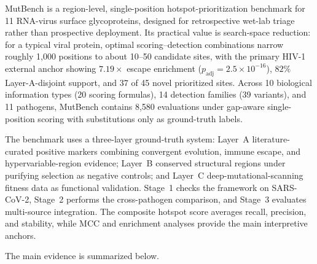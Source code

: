 MutBench is a region-level, single-position hotspot-prioritization benchmark for 11 RNA-virus surface glycoproteins, designed for retrospective wet-lab triage rather than prospective deployment. Its practical value is search-space reduction: for a typical viral protein, optimal scoring--detection combinations narrow roughly 1{,}000 positions to about 10--50 candidate sites, with the primary HIV-1 external anchor showing $7.19\times$ escape enrichment ($p_{\text{adj}} = 2.5 \times 10^{-16}$), $82\%$ Layer-A-disjoint support, and 37 of 45 novel prioritized sites. Across 10 biological information types (20 scoring formulas), 14 detection families (39 variants), and 11 pathogens, MutBench contains 8{,}580 evaluations under gap-aware single-position scoring with substitutions only as ground-truth labels.

The benchmark uses a three-layer ground-truth system: Layer~A literature-curated positive markers combining convergent evolution, immune escape, and hypervariable-region evidence; Layer~B conserved structural regions under purifying selection as negative controls; and Layer~C deep-mutational-scanning fitness data as functional validation. Stage~1 checks the framework on SARS-CoV-2, Stage~2 performs the cross-pathogen comparison, and Stage~3 evaluates multi-source integration. The composite hotspot score averages recall, precision, and stability, while MCC and enrichment analyses provide the main interpretive anchors.

The main evidence is summarized below.

